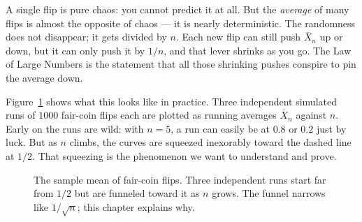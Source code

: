 \begin{intuitionbox}
A single flip is pure chaos: you cannot predict it at all. But the \emph{average} of many flips is almost the opposite of chaos --- it is nearly deterministic. The randomness does not disappear; it gets divided by $n$. Each new flip can still push $\bar X_n$ up or down, but it can only push it by $1/n$, and that lever shrinks as you go. The Law of Large Numbers is the statement that all those shrinking pushes conspire to pin the average down.
\end{intuitionbox}

Figure~\ref{ch20:fig-running-mean} shows what this looks like in practice. Three independent simulated runs of $1000$ fair-coin flips each are plotted as running averages $\bar X_n$ against $n$. Early on the runs are wild: with $n=5$, a run can easily be at $0.8$ or $0.2$ just by luck. But as $n$ climbs, the curves are squeezed inexorably toward the dashed line at $1/2$. That squeezing is the phenomenon we want to understand and prove.

\begin{figure}[H]
\centering
{}
\caption{The sample mean of fair-coin flips. Three independent runs start far from $1/2$ but are funneled toward it as $n$ grows. The funnel narrows like $1/\sqrt n$; this chapter explains why.}
\label{ch20:fig-running-mean}
\end{figure}

